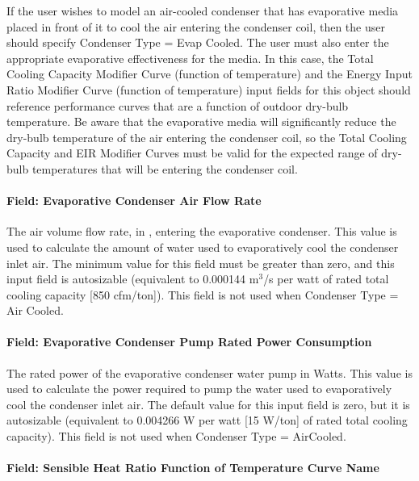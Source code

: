 If the user wishes to model an air-cooled condenser that has evaporative media placed in front of it to cool the air entering the condenser coil, then the user should specify Condenser Type = Evap Cooled. The user must also enter the appropriate evaporative effectiveness for the media. In this case, the Total Cooling Capacity Modifier Curve (function of temperature) and the Energy Input Ratio Modifier Curve (function of temperature) input fields for this object should reference performance curves that are a function of outdoor dry-bulb temperature. Be aware that the evaporative media will significantly reduce the dry-bulb temperature of the air entering the condenser coil, so the Total Cooling Capacity and EIR Modifier Curves must be valid for the expected range of dry-bulb temperatures that will be entering the condenser coil.

\paragraph{Field: Evaporative Condenser Air Flow Rate}\label{field-evaporative-condenser-air-flow-rate-1}

The air volume flow rate, in \si{\volumeFlowRate}, entering the evaporative condenser. This value is used to calculate the amount of water used to evaporatively cool the condenser inlet air. The minimum value for this field must be greater than zero, and this input field is autosizable (equivalent to 0.000144 m\(^{3}\)/s per watt of rated total cooling capacity {[}850 cfm/ton{]}). This field is not used when Condenser Type = Air Cooled.

\paragraph{Field: Evaporative Condenser Pump Rated Power Consumption}\label{field-evaporative-condenser-pump-rated-power-consumption-2}

The rated power of the evaporative condenser water pump in Watts. This value is used to calculate the power required to pump the water used to evaporatively cool the condenser inlet air. The default value for this input field is zero, but it is autosizable (equivalent to 0.004266 W per watt {[}15 W/ton{]} of rated total cooling capacity). This field is not used when Condenser Type = AirCooled.

\paragraph{Field: Sensible Heat Ratio Function of Temperature Curve Name}\label{field-sensible-heat-ratio-function-of-temperature-curve-name-2}

